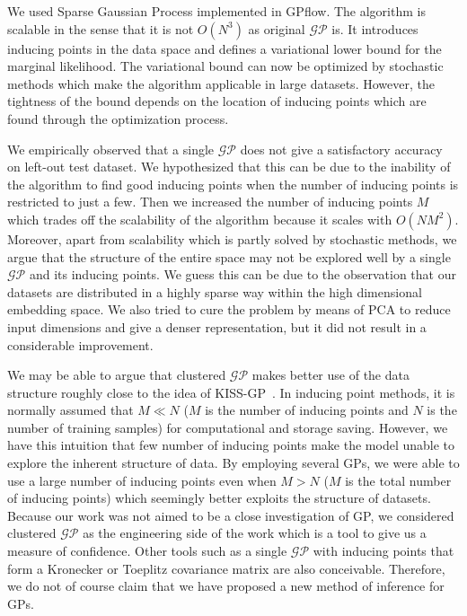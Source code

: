We used Sparse Gaussian Process implemented in GPflow. The algorithm is scalable in the sense that it is not $O(N^3)$ as original $\mathcal{GP}$ is. It introduces inducing points in the data space and defines a variational lower bound for the marginal likelihood. The variational bound can now be optimized by stochastic methods which make the algorithm applicable in large datasets. However, the tightness of the bound depends on the location of inducing points which are found through the optimization process. 

We empirically observed that a single $\mathcal{GP}$ does not give a satisfactory accuracy on left-out test dataset. We hypothesized that this can be due to the inability of the algorithm to find good inducing points when the number of inducing points is restricted to just a few.
Then we increased the number of inducing points $M$ which trades off the scalability of the algorithm because it scales with $O(NM^2)$. Moreover, apart from scalability which is partly solved by stochastic methods, we argue that the structure of the entire space may not be explored well by a single $\mathcal{GP}$ and its inducing points.
We guess this can be due to the observation that our datasets are distributed in a highly sparse way within the high dimensional embedding space. 
We also tried to cure the problem by means of PCA to reduce input dimensions and give a denser representation, but it did not result in a considerable improvement\citep{dehghani:2018:ICLR}. 
%

We may be able to argue that clustered $\mathcal{GP}$ makes better use of the data structure roughly close to the idea of KISS-GP~\citep{Wilson:2015:KIS:3045118.3045307}.
In inducing point methods, it is normally assumed that $M\ll N$ ($M$ is the number of inducing points and $N$ is the number of training samples) for computational and storage saving. However, we have this intuition that few number of inducing points make the model unable to explore the inherent structure of data. By employing several GPs, we were able to use a large number of inducing points even when $M>N$ ($M$ is the total number of inducing points) which seemingly better exploits the structure of datasets. Because our work was not aimed to be a close investigation of GP, we considered clustered $\mathcal{GP}$ as the engineering side of the work which is a tool to give us a measure of confidence. Other tools such as a single $\mathcal{GP}$ with inducing points that form a Kronecker or Toeplitz covariance matrix are also conceivable. Therefore, we do not of course claim that we have proposed a new method of inference for GPs. 

